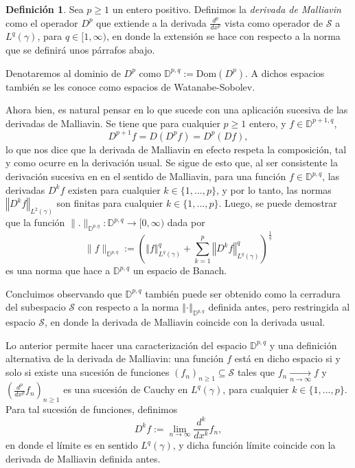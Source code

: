 \documentclass[letterpaper,twoside,12pt]{book}
\newcommand{\D}{\mathbb{D}}
\renewcommand{\S}{\mathcal{S}}
\newcommand{\1}{\mathds{1}}
\renewcommand{\to}{\rightarrow}
\newcommand{\norm}[1]{\left\Vert #1 \right\Vert}
\theoremstyle{definition}
\newtheorem{dfn}{Definición}
\theoremstyle{definition}
\theoremstyle{remark}
\theoremstyle{definition}
\theoremstyle{definition}
\theoremstyle{definition}
\theoremstyle{definition}
\theoremstyle{definition}
\begin{document}
\begin{dfn}
   Sea $p\geq1$ un entero positivo. Definimos la \textit{derivada de Malliavin} como el operador $D^{p}$ que extiende a la derivada $\frac{d^{p}}{dx^{p}}$ vista como operador de $\S$ a $L^{q}(\gamma)$, para $q\in [1,\infty)$, en donde la extensión se hace con respecto a la norma que se definirá unos párrafos abajo. 
\end{dfn}

Denotaremos al dominio de $D^{p}$ como $\D^{p,q}:=\text{Dom}(D^{p})$. A dichos espacios también se les conoce como espacios de Watanabe-Sobolev. 

Ahora bien, es natural pensar en lo que sucede con una aplicación sucesiva de las derivadas de Malliavin. Se tiene que para cualquier $p\geq1$ entero, y $f\in \D^{p+1,q}$, 
\[
   D^{p+1}f=D(D^{p}f)=D^{p}(Df),
\]
lo que nos dice que la derivada de Malliavin en efecto respeta la composición, tal y como ocurre en la derivación usual. Se sigue de esto que, al ser consistente la derivación sucesiva en en el sentido de Malliavin, para una función $f\in \D^{p,q}$, las derivadas $D^{k}f$ existen para cualquier $k\in \{1,...,p\}$, y por lo tanto, las normas $\norm{D^kf}_{L^2(\gamma)}$ son finitas para cualquier $k\in \{1,...,p\}$. Luego, se puede demostrar que la función $\|.\|_{\mathbb{D}^{p,q}}:\D^{p,q}\longrightarrow[0,\infty)$ dada por
\[
   \|f\|_{\D^{p,q}}:=\left(\norm{f}_{L^{q}(\gamma)}^q+\sum_{k=1}^p\norm{D^{k}f}_{L^{q}(\gamma)}^{q}\right)^{\frac{1}{q}}
\] 
es una norma que hace a $\D^{p,q}$ un espacio de Banach.

Concluimos observando que $\D^{p,q}$ también puede ser obtenido como la cerradura del subespacio $\S$ con respecto a la norma $\norm{\cdot}_{\D^{p,q}}$ definida antes, pero restringida al espacio $\S$, en donde la derivada de Malliavin coincide con la derivada usual.

Lo anterior permite hacer una caracterización del espacio $\D^{p,q}$ y una definición alternativa de la derivada de Malliavin: una función $f$ está en dicho espacio si y solo si existe una sucesión de funciones $(f_n)_{n\geq1}\subseteq \S$ tales que $f_n\xrightarrow[n\to\infty]{}f$ y $(\frac{d^{p}}{dx^{p}}f_n)_{n\geq1}$ es una sucesión de Cauchy en $L^q(\gamma)$, para cualquier $k\in \{1,...,p\}$. Para tal sucesión de funciones, definimos 
\[
D^{k}f:=\lim_{n\to \infty}\frac{d^k}{dx^{k}}f_n,
\]
en donde el límite es en sentido $L^{q}(\gamma)$, y dicha función límite coincide con la derivada de Malliavin definida antes.
\end{document}
